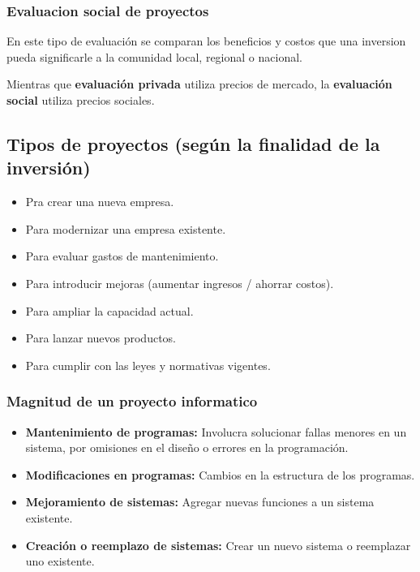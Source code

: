 \documentclass{templateNote}
\begin{document}
\subsubsection*{Evaluacion social de proyectos}
En este tipo de evaluación se comparan los beneficios y costos que una inversion pueda significarle a la comunidad local, regional o nacional.

Mientras que \textbf{evaluación privada} utiliza precios de mercado, la \textbf{evaluación social} utiliza precios sociales. 

\subsection*{Tipos de proyectos (según la finalidad de la inversión)}
\begin{itemize}
    \item Pra crear una nueva empresa.
    \item Para modernizar una empresa existente.
    \item Para evaluar gastos de mantenimiento.
    \item Para introducir mejoras (aumentar ingresos / ahorrar costos).
    \item Para ampliar la capacidad actual.
    \item Para lanzar nuevos productos.
    \item Para cumplir con las leyes y normativas vigentes.
\end{itemize}

\subsubsection*{Magnitud de un proyecto informatico}
\begin{itemize}
    \item \textbf{Mantenimiento de programas:} Involucra solucionar fallas menores en un sistema, por omisiones en el diseño o errores en la programación.
    \item \textbf{Modificaciones en programas:} Cambios en la estructura de los programas.
    \item \textbf{Mejoramiento de sistemas:} Agregar nuevas funciones a un sistema existente.
    \item \textbf{Creación o reemplazo de sistemas:} Crear un nuevo sistema o reemplazar uno existente.
\end{itemize}
\end{document}
